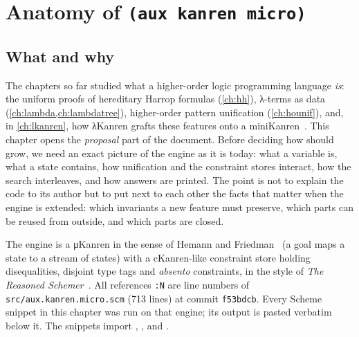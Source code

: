 \chapter{Anatomy of \texorpdfstring{\texttt{(aux kanren micro)}}{(aux kanren micro)}}\label{ch:micro}

\section*{What and why}

The chapters so far studied what a higher-order logic programming language \emph{is}: the uniform
proofs of hereditary Harrop formulas (\cref{ch:hh}), λ-terms as data (\cref{ch:lambda,ch:lambdatree}),
higher-order pattern unification (\cref{ch:hounif}), and, in \cref{ch:lkanren}, how λKanren grafts
these features onto a miniKanren~\cite{MaFriedman2021,MaLuFriedman2020}. This chapter opens the
\emph{proposal} part of the document. Before deciding how \micro{} should grow, we need an exact
picture of the engine as it is today: what a variable is, what a state contains, how unification
and the constraint stores interact, how the search interleaves, and how answers are printed. The
point is not to explain the code to its author but to put next to each other the facts that matter
when the engine is extended: which invariants a new feature must preserve, which parts can be
reused from outside, and which parts are closed.

The engine is a μKanren in the sense of Hemann and Friedman~\cite{HemannFriedman2013} (a goal maps a
state to a stream of states) with a cKanren-like constraint store holding disequalities, disjoint
type tags and \emph{absento} constraints, in the style of \emph{The Reasoned
Schemer}~\cite{FriedmanEtAl2018}. All references \texttt{:N} are line numbers of
\texttt{src/aux.kanren.micro.scm} (713 lines) at commit \texttt{f53bdcb}. Every Scheme snippet in this
chapter was run on that engine; its output is pasted verbatim below it. The snippets import
, ,  and \micro.


